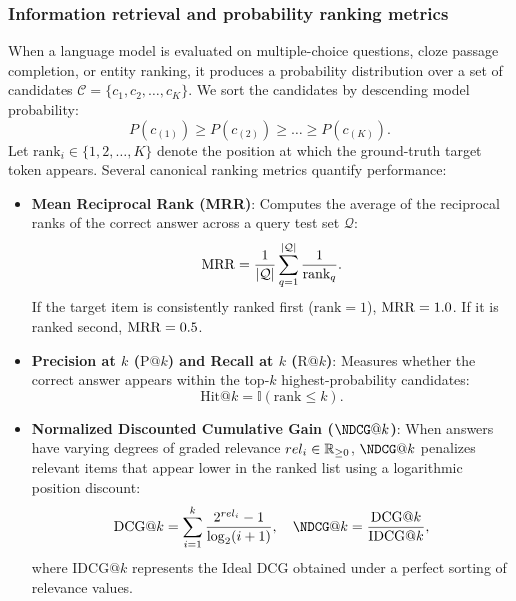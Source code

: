 \documentclass[../../../main.tex]{subfiles}
\begin{document}
\subsubsection{Information retrieval and probability ranking metrics}
When a language model is evaluated on multiple-choice questions, cloze passage completion, or entity ranking, it produces a probability distribution over a set of candidates $\mathcal{C} = \{c_1, c_2, \dots, c_K\}$. We sort the candidates by descending model probability:
\begin{equation*}
P(c_{(1)}) \ge P(c_{(2)}) \ge \dots \ge P(c_{(K)}).
\end{equation*}
Let $\text{rank}_i \in \{1, 2, \dots, K\}$ denote the position at which the ground-truth target token appears. Several canonical ranking metrics quantify performance:
\begin{itemize}
    \item \textbf{Mean Reciprocal Rank (MRR)}: Computes the average of the reciprocal ranks of the correct answer across a query test set $\mathcal{Q}$:
    \begin{equation}
    \label{eq:mrr_def}
    \mathrm{MRR} = \frac{1}{|\mathcal{Q}|} \sum_{q=1}^{|\mathcal{Q}|} \frac{1}{\text{rank}_q}.
    \end{equation}
    If the target item is consistently ranked first ($\text{rank} = 1$), $\mathrm{MRR} = 1.0$. If it is ranked second, $\mathrm{MRR} = 0.5$.
    \item \textbf{Precision at $k$ ($\text{P}@k$) and Recall at $k$ ($\text{R}@k$)}: Measures whether the correct answer appears within the top-$k$ highest-probability candidates:
    \begin{equation}
    \label{eq:hit_at_k}
    \text{Hit}@k = \mathbb{I}(\text{rank} \le k).
    \end{equation}
    \item \textbf{Normalized Discounted Cumulative Gain ($\NDCG@k$)}: When answers have varying degrees of graded relevance $rel_i \in \mathbb{R}_{\ge 0}$, $\NDCG@k$ penalizes relevant items that appear lower in the ranked list using a logarithmic position discount:
    \begin{equation}
    \label{eq:dcg_def}
    \text{DCG}@k = \sum_{i=1}^k \frac{2^{rel_i} - 1}{\log_2(i + 1)}, \quad \NDCG@k = \frac{\text{DCG}@k}{\text{IDCG}@k},
    \end{equation}
    where $\text{IDCG}@k$ represents the Ideal DCG obtained under a perfect sorting of relevance values.
\end{itemize}
\end{document}
